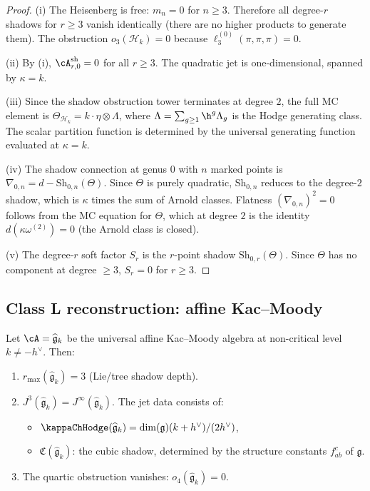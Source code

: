 \begin{proof}
(i) The Heisenberg is free: $m_n = 0$ for $n \geq 3$. Therefore all degree-$r$ shadows
for $r \geq 3$ vanish identically (there are no higher products to generate them). The
obstruction $o_3(\mathcal{H}_k) = 0$ because $\ell_3^{(0)}(\pi, \pi, \pi) = 0$.

(ii) By (i), $\cA^{\mathrm{sh}}_{r,0} = 0$ for all $r \geq 3$. The quadratic jet is
one-dimensional, spanned by $\kappa = k$.

(iii) Since the shadow obstruction tower terminates at degree $2$, the full MC element is
$\Theta_{\mathcal{H}_k} = k \cdot \eta \otimes \Lambda$, where
$\Lambda = \sum_{g \geq 1} \h^g \Lambda_g$ is the Hodge generating class. The
scalar partition function is determined by the universal generating function evaluated at
$\kappa = k$.

(iv) The shadow connection at genus $0$ with $n$ marked points is
$\nabla_{0,n} = d - \mathrm{Sh}_{0,n}(\Theta)$. Since $\Theta$ is purely quadratic,
$\mathrm{Sh}_{0,n}$ reduces to the degree-$2$ shadow, which is $\kappa$ times the
sum of Arnold classes. Flatness $(\nabla_{0,n})^2 = 0$ follows from the MC equation
for $\Theta$, which at degree $2$ is the identity $d(\kappa \omega^{(2)}) = 0$ (the
Arnold class is closed).

(v) The degree-$r$ soft factor $S_r$ is the $r$-point shadow
$\mathrm{Sh}_{0,r}(\Theta)$. Since $\Theta$ has no component at degree $\geq 3$,
$S_r = 0$ for $r \geq 3$.
\end{proof}

\subsection{Class L reconstruction: affine Kac--Moody}

\begin{theorem}
\label{thm:class-l-reconstruction}
Let $\cA = \widehat{\mathfrak{g}}_k$ be the universal affine Kac--Moody algebra at
non-critical level $k \neq -h^\vee$. Then:
\begin{enumerate}[label=\textup{(\roman*)}]
\item $r_{\max}(\widehat{\mathfrak{g}}_k) = 3$ (Lie/tree shadow depth).
\item $J^3(\widehat{\mathfrak{g}}_k) = J^\infty(\widehat{\mathfrak{g}}_k)$. The jet data
 consists of:
 \begin{itemize}
 \item $\kappaChHodge(\widehat{\mathfrak{g}}_k) = \dim(\mathfrak{g})(k + h^\vee)/(2h^\vee)$,
 \item $\mathfrak{C}(\widehat{\mathfrak{g}}_k)$: the cubic shadow, determined by the
 structure constants $f^c_{ab}$ of $\mathfrak{g}$.
 \end{itemize}
\item The quartic obstruction vanishes: $o_4(\widehat{\mathfrak{g}}_k) = 0$.
\end{enumerate}
\end{theorem}

